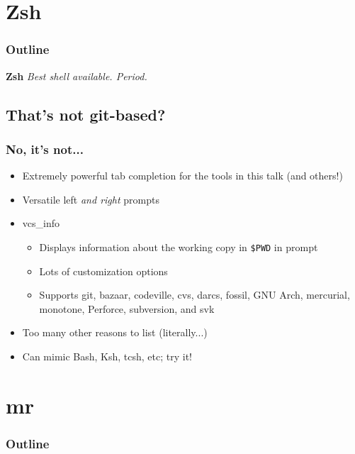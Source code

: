 \documentclass[t]{beamer}
\begin{document}
\section{Zsh}

\begin{frame}
	\frametitle{Outline}
	\tableofcontents[currentsection]
\end{frame}

\begin{frame}
		\begin{center}
			\vfill
			\vfill
			\textbf{Zsh}
			\vfill
			\textit{Best shell available. Period.}
			\vfill
			\vfill
		\end{center}
\end{frame}

\subsection{That's not git-based?}

\begin{frame}
	\frametitle{No, it's not...}
	\begin{itemize}
		\item Extremely powerful tab completion for the tools in this talk (and others!)
		\item Versatile left \emph{and right} prompts
		\item vcs\_info
		\begin{itemize}
			\item Displays information about the working copy in \texttt{\$PWD} in prompt
			\item Lots of customization options
			\item Supports git, bazaar, codeville, cvs, darcs, fossil, GNU Arch, mercurial, monotone, Perforce, subversion, and svk
		\end{itemize}
		\item Too many other reasons to list (literally...)
		\item Can mimic Bash, Ksh, tcsh, etc; try it!
	\end{itemize}
\end{frame}


\section{mr}

\begin{frame}
	\frametitle{Outline}
	\tableofcontents[currentsection]
\end{frame}
\end{document}
